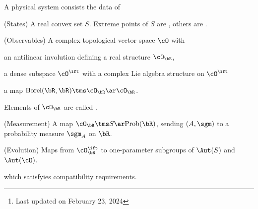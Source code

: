 \documentclass[a4paper, twoside]{article}
\title{\tbf{Mathematical physics}}
\author{\tbf{Notes} by Cong Wen, 02/2024}
\date{}
\begin{document}
\maketitle
\thispagestyle{empty}
\begin{abstract}
	This is my self-use notes\footnote{Last updated on February 23, 2024} in mathematical physics.

	Please reach out if you find anything incorrect.

\end{abstract}
\tableofcontents

\begin{dfn}
	A physical system consists the data of
	\begin{enr}
		\item (States) A real convex set $S$. Extreme points of $S$ are , others are .
		\item (Observables) A complex topological vector space $\cO$ with
			\begin{enr}
				\item an antilinear involution defining a real structure $\cO_{\bR}$,
				\item a dense subspace $\cO^{\ift}$ with a complex Lie algebra structure on $\cO^{\ift}$
				\item a map $\mathrm{Borel}(\bR,\bR)\tms\cO_{\bR}\ar\cO_{\bR}$.
			\end{enr}
			Elements of $\cO_{\bR}$ are called .
		\item (Measurement) A map $\cO_{\bR}\tms S\ar \mathrm{Prob}(\bR)$, sending $(A,\sgm)$ to a probability measure $\sgm_{A}$ on $\bR$.
		\item (Evolution) Maps from $\cO_{\bR}^{\ift}$ to one-parameter subgroups of $\Aut(S)$ and $\Aut(\cO)$.
	\end{enr}
	which satisfyies compatibility requirements.
\end{dfn}




\end{document}
